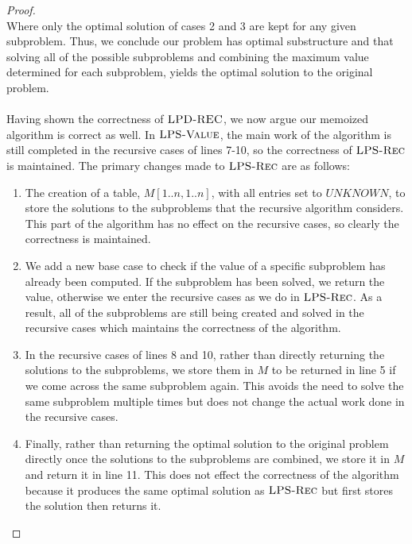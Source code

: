\documentclass[11pt]{article}
\theoremstyle{nonumberplain}
\newtheorem{proof}{Proof}
\begin{document}
\begin{enumerate}
\begin{proof}
  \\
  Where only the optimal solution of cases 2 and 3 are kept for any given subproblem. %
  Thus, we conclude our problem has optimal substructure and that solving all of the possible subproblems and combining the maximum value determined for each subproblem, yields the optimal solution to the original problem.\\
  \\
  Having shown the correctness of $\textnormal{\scshape LPD-REC}$, we now argue our memoized algorithm is correct as well. In $\textnormal{\scshape LPS-Value}$, the main work of the algorithm is still completed in the recursive cases of lines 7-10, so the correctness of $\textnormal{\scshape LPS-Rec}$ is maintained. The primary changes made to $\textnormal{\scshape LPS-Rec}$ are as follows: 
  \begin{enumerate}
      \item The creation of a table, $M[1..n,1..n]$, with all entries set to $UNKNOWN$, to store the solutions to the subproblems that the recursive algorithm considers. This part of the algorithm has no effect on the recursive cases, so clearly the correctness is maintained.
      \item We add a new base case to check if the value of a specific subproblem has already been computed. If the subproblem has been solved, we return the value, otherwise we enter the recursive cases as we do in $\textnormal{\scshape LPS-Rec}$. As a result, all of the subproblems are still being created and solved in the recursive cases which maintains the correctness of the algorithm.
      \item In the recursive cases of lines 8 and 10, rather than directly returning the solutions to the subproblems, we store them in $M$ to be returned in line 5 if we come across the same subproblem again. This avoids the need to solve the same subproblem multiple times but does not change the actual work done in the recursive cases.
      \item Finally, rather than returning the optimal solution to the original problem directly once the solutions to the subproblems are combined, we store it in $M$ and return it in line 11. This does not effect the correctness of the algorithm because it produces the same optimal solution as $\textnormal{\scshape LPS-Rec}$ but first stores the solution then returns it. 

\end{enumerate}
\end{proof}
\end{enumerate}
\end{document}
